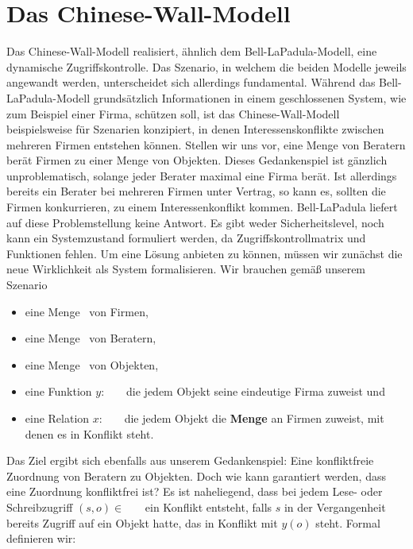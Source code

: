 \section{Das Chinese-Wall-Modell}
Das Chinese-Wall-Modell realisiert, ähnlich dem Bell-LaPadula-Modell, eine dynamische Zugriffskontrolle. Das Szenario, in welchem die beiden Modelle jeweils angewandt werden, unterscheidet sich allerdings fundamental.
Während das Bell-LaPadula-Modell grundsätzlich Informationen in einem geschlossenen System, wie zum Beispiel einer Firma, schützen soll, ist das Chinese-Wall-Modell beispielsweise für Szenarien konzipiert, in denen Interessenskonflikte zwischen mehreren Firmen entstehen können.
Stellen wir uns vor, eine Menge von Beratern berät Firmen zu einer Menge von Objekten. Dieses Gedankenspiel ist gänzlich unproblematisch, solange jeder Berater maximal eine Firma berät. Ist allerdings bereits ein Berater bei mehreren Firmen unter Vertrag, so kann es, sollten die Firmen konkurrieren, zu einem Interessenkonflikt kommen. Bell-LaPadula liefert auf diese Problemstellung keine Antwort. Es gibt weder Sicherheitslevel, noch kann ein Systemzustand formuliert werden, da Zugriffskontrollmatrix und Funktionen fehlen.
Um eine Lösung anbieten zu können, müssen wir zunächst die neue Wirklichkeit als System formalisieren. Wir brauchen gemäß unserem Szenario

\begin{itemize}
	\item eine Menge \calC\ von Firmen,
	\item eine Menge \calS\ von Beratern,
	\item eine Menge \calO\ von Objekten,
	\item eine Funktion \(y:\) \calO\ \rArrow\ \calC\, die jedem Objekt seine eindeutige Firma zuweist und
	\item eine Relation \(x:\) \calO\ \rArrow\ \calC\, die jedem Objekt die \textbf{Menge} an Firmen zuweist, mit denen es in Konflikt steht.
\end{itemize}

Das Ziel ergibt sich ebenfalls aus unserem Gedankenspiel: Eine konfliktfreie Zuordnung von Beratern zu Objekten. Doch wie kann garantiert werden, dass eine Zuordnung konfliktfrei ist? %
Es ist naheliegend, dass bei jedem Lese- oder Schreibzugriff \((s, o) \in\) \calS\ \ctsProd\ \calO\ ein Konflikt entsteht, falls \(s\) in der Vergangenheit bereits Zugriff auf ein Objekt hatte, das in Konflikt mit \(y(o)\) steht. Formal definieren wir: 

